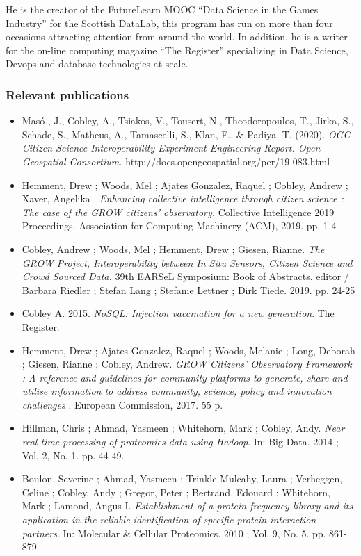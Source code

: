\documentclass[a4paper,11pt]{article}
\begin{document}
He is the creator of the FutureLearn MOOC “Data Science in the Games Industry” for the Scottish DataLab, this program has run on more than four occasions attracting attention from around the world. In addition, he is a writer for the on-line computing magazine “The Register” specializing in Data Science, Devops and database technologies at scale. 
\subsubsection*{Relevant publications}
\begin{itemize}

\item 
Masó , J., Cobley, A., Tsiakos, V., Tousert, N., Theodoropoulos, T., Jirka, S., Schade, S., Matheus, A., Tamascelli, S., Klan, F., \& Padiya, T. (2020). \emph{OGC Citizen Science Interoperability Experiment Engineering Report. Open Geospatial Consortium.} http://docs.opengeospatial.org/per/19-083.html
\item
Hemment, Drew  ; Woods, Mel  ; Ajates Gonzalez, Raquel  ; Cobley, Andrew ; Xaver, Angelika .  \emph{Enhancing collective intelligence through citizen science : The case of the GROW citizens’ observatory.} Collective Intelligence 2019 Proceedings. Association for Computing Machinery (ACM), 2019. pp. 1-4
\item Cobley, Andrew  ; Woods, Mel  ; Hemment, Drew ; Giesen, Rianne.  \emph{The GROW Project, Interoperability between In Situ Sensors, Citizen Science and Crowd Sourced Data.} 39th EARSeL Symposium: Book of Abstracts. editor / Barbara Riedler ; Stefan Lang ; Stefanie Lettner ; Dirk Tiede. 2019. pp. 24-25
\item
Cobley A. 2015. \emph{NoSQL: Injection vaccination for a new generation}. The Register.
\item Hemment, Drew  ; Ajates Gonzalez, Raquel  ; Woods, Melanie  ; Long, Deborah ; Giesen, Rianne  ; Cobley, Andrew. \emph{GROW Citizens’ Observatory Framework : A reference and guidelines for community platforms to generate, share and utilise information to address community, science, policy and innovation challenges }. European Commission, 2017. 55 p.
\item Hillman, Chris  ; Ahmad, Yasmeen  ; Whitehorn, Mark  ; Cobley, Andy. \emph{Near real-time processing of proteomics data using Hadoop}. In: Big Data. 2014 ; Vol. 2, No. 1. pp. 44-49.
\item Boulon, Severine  ; Ahmad, Yasmeen  ; Trinkle-Mulcahy, Laura ; Verheggen, Celine  ; Cobley, Andy  ; Gregor, Peter ; Bertrand, Edouard  ; Whitehorn, Mark  ; Lamond, Angus I.  \emph{Establishment of a protein frequency library and its application in the reliable identification of specific protein interaction partners}. In: Molecular \& Cellular Proteomics. 2010 ; Vol. 9, No. 5. pp. 861-879.
\end{itemize}
\end{document}
